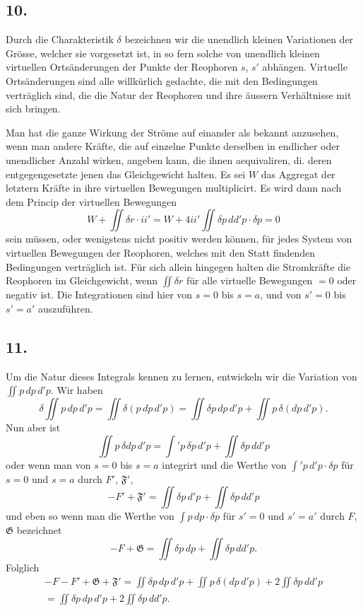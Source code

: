 \documentclass[fontsize=10pt,paper=a5,pagesize=auto]{scrbook}
\newcommand{\origpage}[1]{\marginpar{\footnotesize\textit{S. #1}}}
\begin{document}
\subsection*{10.}
\origpage{609}
Durch die Charakteristik $\delta$ bezeichnen wir die unendlich kleinen Variationen der Grösse, welcher sie vorgesetzt ist, in so fern solche von unendlich kleinen virtuellen Ortsänderungen der Punkte der Reophoren $s$, $s'$ abhängen. Virtuelle Ortsänderungen sind alle willkürlich gedachte, die mit den Bedingungen verträglich sind, die die Natur der Reophoren und ihre äussern Verhältnisse mit sich bringen.

Man hat die ganze Wirkung der Ströme auf einander als bekannt anzusehen, wenn man andere Kräfte, die auf einzelne Punkte derselben in endlicher oder unendlicher Anzahl wirken, angeben kann, die ihnen aequivaliren, di. deren entgegengesetzte jenen das Gleichgewicht halten. Es sei $W$ das Aggregat der letztern Kräfte in ihre virtuellen Bewegungen multiplicirt. Es wird dann nach dem Princip der virtuellen Bewegungen
\[
W + \iint \delta r \cdot i i' = W + 4ii' \iint \delta p \, dd'p \cdot \delta p = 0
\]
sein müssen, oder wenigstens nicht positiv werden können, für jedes System von virtuellen Bewegungen der Reophoren, welches mit den Statt findenden Bedingungen verträglich ist. Für sich allein hingegen halten die Stromkräfte die Reophoren im Gleichgewicht, wenn $\iint \delta r$ für alle virtuelle Bewegungen $= 0$ oder negativ ist. Die Integrationen sind hier von $s = 0$ bis $s = a$, und von $s' = 0$ bis $s' = a'$ auszuführen.

\subsection*{11.}
\origpage{610}
Um die Natur dieses Integrals kennen zu lernen, entwickeln wir die Variation von $\iint p \, dp \, d'p$. Wir haben
\[
\delta \iint p \, dp \, d'p = \iint \delta(p \, dp \, d'p) = \iint \delta p \, dp \, d'p + \iint p \, \delta(dp \, d'p).
\]
Nun aber ist
\[
\iint p \, \delta dp \, d'p = \int' p \, \delta p \, d'p + \iint \delta p \, dd'p
\]
oder wenn man von $s = 0$ bis $s = a$ integrirt und die Werthe von $\int' p \, d'p \cdot \delta p$ für $s = 0$ und $s = a$ durch $F'$, $\mathfrak{F}'$,
\[
-F' + \mathfrak{F}' = \iint \delta p \, d'p + \iint \delta p \, dd'p
\]
und eben so wenn man die Werthe von $\int p \, dp \cdot \delta p$ für $s' = 0$ und $s' = a'$ durch $F$, $\mathfrak{G}$ bezeichnet
\[
-F + \mathfrak{G} = \iint \delta p \, dp + \iint \delta p \, dd'p.
\]
Folglich
\begin{multline*}
-F - F' + \mathfrak{G} + \mathfrak{F}' = \iint \delta p \, dp \, d'p + \iint p \, \delta(dp \, d'p) + 2\iint \delta p \, dd'p\\
= \iint \delta p \, dp \, d'p + 2\iint \delta p \, dd'p.
\end{multline*}
\end{document}
